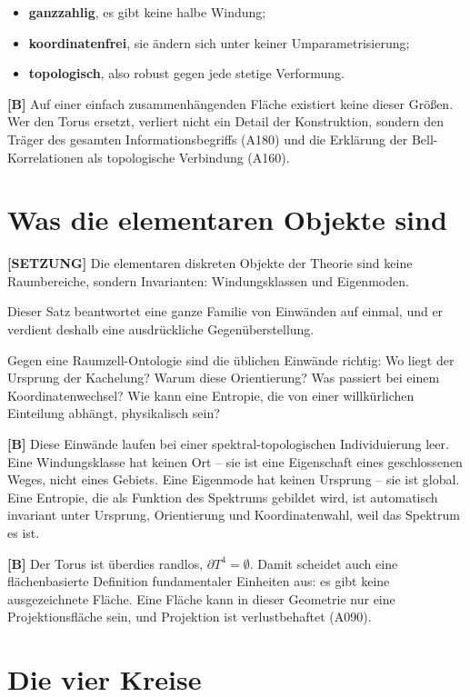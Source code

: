 \begin{itemize}
  \item \textbf{ganzzahlig}, es gibt keine halbe Windung;
  \item \textbf{koordinatenfrei}, sie ändern sich unter keiner Umparametrisierung;
  \item \textbf{topologisch}, also robust gegen jede stetige Verformung.
\end{itemize}

\textbf{[B]} Auf einer einfach zusammenhängenden Fläche existiert keine dieser
Größen. Wer den Torus ersetzt, verliert nicht ein Detail der Konstruktion,
sondern den Träger des gesamten Informationsbegriffs (A180) und die Erklärung
der Bell-Korrelationen als topologische Verbindung (A160).

\section{Was die elementaren Objekte sind}

\textbf{[SETZUNG]} Die elementaren diskreten Objekte der Theorie sind keine
Raumbereiche, sondern Invarianten: Windungsklassen und Eigenmoden.

Dieser Satz beantwortet eine ganze Familie von Einwänden auf einmal, und er
verdient deshalb eine ausdrückliche Gegenüberstellung.

Gegen eine Raumzell-Ontologie sind die üblichen Einwände richtig: Wo liegt der
Ursprung der Kachelung? Warum diese Orientierung? Was passiert bei einem
Koordinatenwechsel? Wie kann eine Entropie, die von einer willkürlichen
Einteilung abhängt, physikalisch sein?

\textbf{[B]} Diese Einwände laufen bei einer spektral-topologischen
Individuierung leer. Eine Windungsklasse hat keinen Ort -- sie ist eine
Eigenschaft eines geschlossenen Weges, nicht eines Gebiets. Eine Eigenmode hat
keinen Ursprung -- sie ist global. Eine Entropie, die als Funktion des Spektrums
gebildet wird, ist automatisch invariant unter Ursprung, Orientierung und
Koordinatenwahl, weil das Spektrum es ist.

\textbf{[B]} Der Torus ist überdies randlos, $\partial T^4 = \emptyset$. Damit
scheidet auch eine flächenbasierte Definition fundamentaler Einheiten aus: es
gibt keine ausgezeichnete Fläche. Eine Fläche kann in dieser Geometrie nur eine
Projektionsfläche sein, und Projektion ist verlustbehaftet (A090).

\section{Die vier Kreise}

